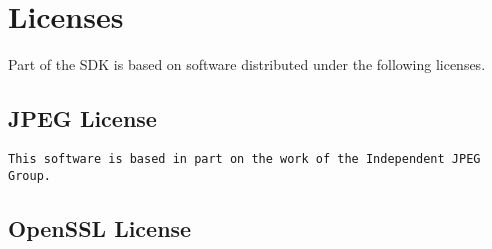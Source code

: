 \chapter{Licenses}
\label{sec:licenses}

Part of the \urbi SDK is based on software distributed under the
following licenses.


\section{JPEG License}

\begin{lstlisting}[language={},basicstyle={\ttfamily\footnotesize}]
This software is based in part on the work of the Independent JPEG Group.
\end{lstlisting}

\section{OpenSSL License}




